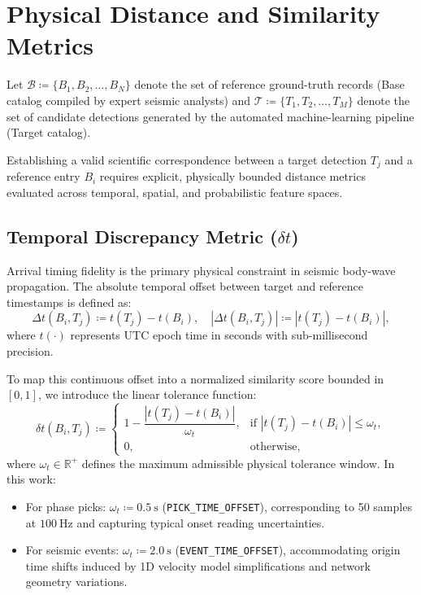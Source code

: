\section{Physical Distance and Similarity Metrics}
\label{sec:distance_metrics}

Let $\mathcal{B} \coloneqq \{B_1, B_2, \dots, B_N\}$ denote the set of
reference ground-truth records (Base catalog compiled by expert
seismic analysts) and $\mathcal{T} \coloneqq \{T_1, T_2, \dots, T_M\}$
denote the set of candidate detections generated by the automated
machine-learning pipeline (Target catalog).

Establishing a valid scientific correspondence between a target
detection $T_j$ and a reference entry $B_i$ requires explicit,
physically bounded distance metrics evaluated across temporal,
spatial, and probabilistic feature spaces.

\subsection{Temporal Discrepancy Metric (\texorpdfstring{$\delta t$}{delta t})}
Arrival timing fidelity is the primary physical constraint in
seismic body-wave propagation. The absolute temporal offset between
target and reference timestamps is defined as:
\begin{equation}
  \Delta t(B_i, T_j) \coloneqq t(T_j) - t(B_i), \quad |\Delta t(B_i,
  T_j)| \coloneqq
  |t(T_j) - t(B_i)|,
\end{equation}
where $t( \cdot )$ represents UTC epoch time in seconds with
sub-millisecond precision.

To map this continuous offset into a normalized similarity score
bounded in $[0, 1]$, we introduce the linear tolerance function:
\begin{equation}
  \delta t(B_i, T_j) \coloneqq
  \begin{cases}
    1 - \dfrac{|t(T_j) - t(B_i)|}{\omega_t}, & \text{if } |t(T_j) -
    t(B_i)| \le \omega_t, \\[8pt]
    0, & \text{otherwise},
  \end{cases}
\end{equation}
where $\omega_t \in \mathbb{R}^+$ defines the maximum admissible
physical tolerance window. In this work:
\begin{itemize}
  \item For phase picks: $\omega_t \coloneqq \qty{0.5}{\second}$
    (\texttt{PICK\_TIME\_OFFSET}), corresponding to \num{50} samples at
    $\qty{100}{\hertz}$ and capturing typical onset reading uncertainties.
  \item For seismic events: $\omega_t \coloneqq \qty{2.0}{\second}$
    (\texttt{EVENT\_TIME\_OFFSET}), accommodating origin time shifts
    induced by 1D velocity model simplifications and network
    geometry variations.
\end{itemize}

